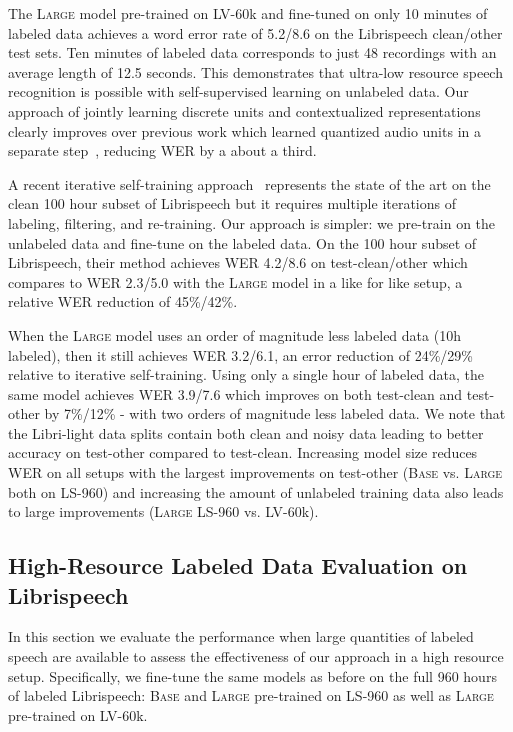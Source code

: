 \documentclass{article}
\newcommand{\wvppbase}{\textsc{Base}}
\newcommand{\wvppbig}{\textsc{Large}}
\newcommand{\libri}{Librispeech}
\newcommand{\libril}{Libri-light}
\newcommand{\voxsz}{LV-60k}
\newcommand{\librisz}{LS-960}
\begin{document}
The \wvppbig{} model pre-trained on \voxsz{} and fine-tuned on only 10 minutes of labeled data achieves a word error rate of 5.2/8.6 on the \libri{} clean/other test sets.
Ten minutes of labeled data corresponds to just 48 recordings with an average length of 12.5 seconds.
This demonstrates that ultra-low resource speech recognition is possible with self-supervised learning on unlabeled data.
Our approach of jointly learning discrete units and contextualized representations clearly improves over previous work which learned quantized audio units in a separate step~\citep{baevski2019effectiveness}, reducing WER by a about a third.

A recent iterative self-training approach~\citep{park2020improved} represents the state of the art on the clean 100 hour subset of \libri{} but it requires multiple iterations of labeling, filtering, and re-training. 
Our approach is simpler: we pre-train on the unlabeled data and fine-tune on the labeled data.
On the 100 hour subset of Librispeech, their method achieves WER 4.2/8.6 on test-clean/other which compares to WER 2.3/5.0 with the \wvppbig{} model in a like for like setup, a relative WER reduction of 45\%/42\%.

When the \wvppbig{} model uses an order of magnitude less labeled data (10h labeled), then it still achieves WER 3.2/6.1, an error reduction of 24\%/29\% relative to iterative self-training.
Using only a single hour of labeled data, the same model achieves WER 3.9/7.6 which improves on both test-clean and test-other by 7\%/12\% - with two orders of magnitude less labeled data.
We note that the \libril{} data splits contain both clean and noisy data leading to better accuracy on test-other compared to test-clean.
Increasing model size reduces WER on all setups with the largest improvements on test-other (\wvppbase{} vs. \wvppbig{} both on \librisz{}) and increasing the amount of unlabeled training data also leads to large improvements (\wvppbig{} \librisz{} vs. \voxsz{}).





\subsection{High-Resource Labeled Data Evaluation on \libri{}}

In this section we evaluate the performance when large quantities of labeled speech are available to assess the effectiveness of our approach in a high resource setup.
Specifically, we fine-tune the same models as before on the full 960 hours of labeled \libri{}: \wvppbase{} and \wvppbig{} pre-trained on \librisz{} as well as \wvppbig{} pre-trained on \voxsz{}.
\end{document}
